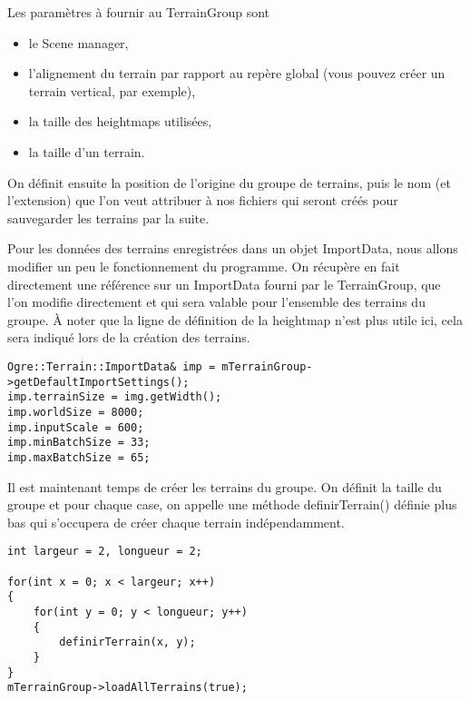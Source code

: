 \documentclass[10pt,a4paper]{report}
\begin{document}
Les param\`etres \`a fournir au TerrainGroup sont
\begin{itemize}
\item le Scene manager,
\item l'alignement du terrain par rapport au rep\`ere global (vous pouvez cr\'eer un terrain vertical, par exemple),
\item la taille des heightmaps utilis\'ees, 
\item la taille d'un terrain.
\end{itemize}

On d\'efinit ensuite la position de l'origine du groupe de terrains, puis le nom (et l'extension) que l'on veut attribuer \`a nos fichiers qui seront cr\'e\'es pour sauvegarder les terrains par la suite.

Pour les donn\'ees des terrains enregistr\'ees dans un objet ImportData, nous allons modifier un peu le fonctionnement du programme. On r\'ecup\`ere en fait directement une r\'ef\'erence sur un ImportData fourni par le TerrainGroup, que l'on modifie directement et qui sera valable pour l'ensemble des terrains du groupe. \`A noter que la ligne de d\'efinition de la heightmap n'est plus utile ici, cela sera indiqu\'e lors de la cr\'eation des terrains.

\begin{lstlisting}[caption={}]
Ogre::Terrain::ImportData& imp = mTerrainGroup->getDefaultImportSettings();
imp.terrainSize = img.getWidth();
imp.worldSize = 8000;
imp.inputScale = 600;
imp.minBatchSize = 33;
imp.maxBatchSize = 65;
\end{lstlisting}

Il est maintenant temps de cr\'eer les terrains du groupe. On d\'efinit la taille du groupe et pour chaque case, on appelle une m\'ethode definirTerrain() d\'efinie plus bas qui s'occupera de cr\'eer chaque terrain ind\'ependamment.

\begin{lstlisting}[caption={Cr\'eation des terrains du groupe}]
int largeur = 2, longueur = 2;

for(int x = 0; x < largeur; x++)
{
    for(int y = 0; y < longueur; y++)
    {
        definirTerrain(x, y);
    }
}
mTerrainGroup->loadAllTerrains(true);
\end{lstlisting}
\end{document}
